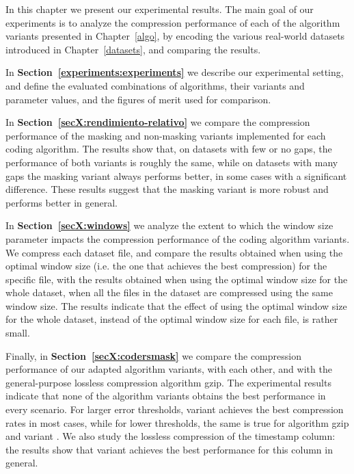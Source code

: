 






In this chapter we present our experimental results. The main goal of our experiments is to analyze the compression performance of each of the algorithm variants presented in Chapter~\ref{algo}, by encoding the various real-world datasets introduced in Chapter~\ref{datasets}, and comparing the results.

In \textbf{Section~\ref{experiments:experiments}} we describe our experimental setting, and define the evaluated combinations of algorithms, their variants and parameter values, and the figures of merit used for comparison. 

In \textbf{Section~\ref{secX:rendimiento-relativo}} we compare the compression performance of the masking and non-masking variants implemented for each coding algorithm. The results show that, on datasets with few or no gaps, the performance of both variants is roughly the same, while on datasets with many gaps the masking variant always performs better, in some cases with a significant difference. These results suggest that the masking variant is more robust and performs better in general. 

In \textbf{Section~\ref{secX:windows}} we analyze the extent to which the window size parameter impacts the compression performance of the coding algorithm variants. We compress each dataset file, and compare the results obtained when using the optimal window size (i.e. the one that achieves the best compression) for the specific file, with the results obtained when using the optimal window size for the whole dataset, when all the files in the dataset are compressed using the same window size. The results indicate that the effect of using the optimal window size for the whole dataset, instead of the optimal window size for each file, is rather small. 

Finally, in \textbf{Section~\ref{secX:codersmask}} we compare the compression performance of our adapted algorithm variants, with each other, and with the general-purpose lossless compression algorithm gzip. The experimental results indicate that none of the algorithm variants obtains the best performance in every scenario. For larger error thresholds, variant  achieves the best compression rates in most cases, while for lower thresholds, the same is true for algorithm gzip and variant . We also study the lossless compression of the timestamp column: the results show that variant  achieves the best performance for this column in general.
